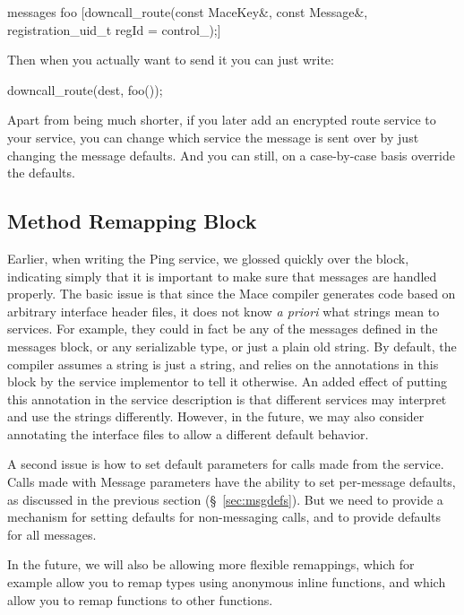 \begin{programlisting}
messages {
  foo [downcall_route(const MaceKey&, const Message&, registration_uid_t regId = control_);] { }
}
\end{programlisting}
Then when you actually want to send it you can just write:

\begin{programlisting}
downcall_route(dest, foo());
\end{programlisting}

Apart from being much shorter, if you later add an encrypted route service 
to your service, you can change which service the  message is 
sent over by just changing the message defaults.  And you can still, on 
a case-by-case basis override the defaults.

\subsection{Method Remapping Block}
\label{sec:method_remapping}

Earlier, when writing the Ping service, we glossed quickly over the
 block, indicating simply that it is
important to make sure that messages are handled properly.  The basic
issue is that since the Mace compiler generates code based on
arbitrary interface header files, it does not know \emph{a priori} what
strings mean to services.  For example, they could in fact be any of
the messages defined in the messages block, or any serializable type,
or just a plain old string.  By default, the compiler assumes a string
is just a string, and relies on the annotations in this block by the
service implementor to tell it otherwise.  An added effect of putting
this annotation in the service description is that different services
may interpret and use the strings differently.  However, in the
future, we may also consider annotating the interface files to allow a
different default behavior.

A second issue is how to set default parameters for calls made from
the service.  Calls made with Message parameters have the ability to
set per-message defaults, as discussed in the previous section
(\S~\ref{sec:msgdefs}).  But we need to provide a mechanism for
setting defaults for non-messaging calls, and to provide defaults for 
all messages.

In the future, we will also be allowing more flexible remappings, which for
example allow you to remap types using anonymous inline functions, and 
which allow you to remap functions to other functions.

